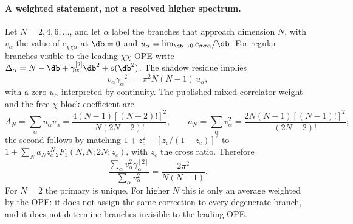 \paragraph{A weighted statement, not a resolved higher spectrum.} Let $N=2,4,6,\ldots$, and let $\alpha$ label the
branches that approach dimension $N$, with $v_\alpha$ the value of $c_{\chi\chi\alpha}$ at $\db=0$ and
$u_\alpha=\lim_{\db\to0}c_{\sigma\sigma\alpha}/\db$. For regular branches visible to the leading $\chi\chi$ OPE write
$\Delta_\alpha=N-\db+\gamma^{[2]}_\alpha\db^2+o(\db^2)$. The shadow residue implies
\begin{equation}
 v_\alpha\gamma^{[2]}_\alpha=\pi^2N(N-1)\,u_\alpha,
\end{equation}
with a zero $u_\alpha$ interpreted by continuity. The published mixed-correlator weight and the free $\chi$ block
coefficient are
\begin{equation}
 A_N=\sum_\alpha u_\alpha v_\alpha=\frac{4(N-1)[(N-2)!]^2}{N(2N-2)!},\qquad
 a_N=\sum_\alpha v_\alpha^2=\frac{2N(N-1)[(N-1)!]^2}{(2N-2)!};
\end{equation}
the second follows by matching $1+z_c^2+[z_c/(1-z_c)]^2$ to $1+\sum_Na_Nz_c^N{}_2F_1(N,N;2N;z_c)$, with $z_c$ the cross
ratio. Therefore
\begin{equation}
 \frac{\sum_\alpha v_\alpha^2\gamma^{[2]}_\alpha}{\sum_\alpha v_\alpha^2}=\frac{2\pi^2}{N(N-1)} .
\end{equation}
For $N=2$ the primary is unique. For higher $N$ this is only an average weighted by the OPE: it does not assign the
same correction to every degenerate branch, and it does not determine branches invisible to the leading OPE.

